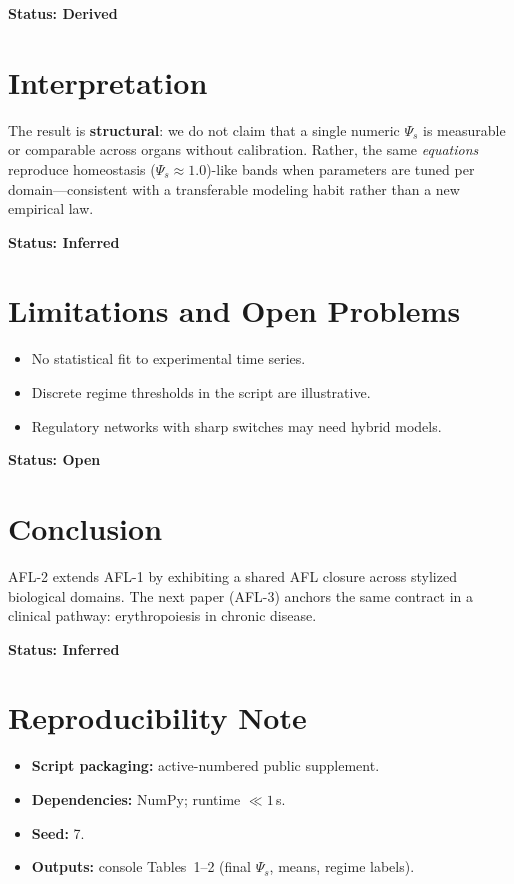 \documentclass[11pt]{article}
\begin{document}
\textbf{Status: Derived}

\section{Interpretation}
The result is \textbf{structural}: we do not claim that a single numeric $\Psi_s$ is measurable or comparable across organs without calibration. Rather, the same \emph{equations} reproduce homeostasis ($\Psi_s \approx 1.0$)-like bands when parameters are tuned per domain---consistent with a transferable modeling habit rather than a new empirical law.

\textbf{Status: Inferred}

\section{Limitations and Open Problems}
\begin{itemize}
  \item No statistical fit to experimental time series.
  \item Discrete regime thresholds in the script are illustrative.
  \item Regulatory networks with sharp switches may need hybrid models.
\end{itemize}

\textbf{Status: Open}

\section{Conclusion}
AFL-2 extends AFL-1 by exhibiting a shared AFL closure across stylized biological domains. The next paper (AFL-3) anchors the same contract in a clinical pathway: erythropoiesis in chronic disease.

\textbf{Status: Inferred}

\section{Reproducibility Note}
\begin{itemize}
  \item \textbf{Script packaging:} active-numbered public supplement.
  \item \textbf{Dependencies:} NumPy; runtime $\ll 1$\,s.
  \item \textbf{Seed:} 7.
  \item \textbf{Outputs:} console Tables~1--2 (final $\Psi_s$, means, regime labels).
\end{itemize}
\end{document}
